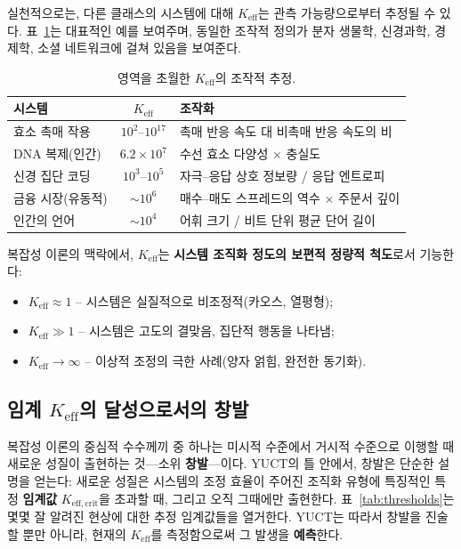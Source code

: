 \documentclass[11pt,a4paper]{article}
\theoremstyle{remark}
\newcommand{\Keff}{K_{\mathrm{eff}}}
\newcommand{\Keffcrit}{K_{\mathrm{eff},\text{crit}}}
\begin{document}
	실천적으로는, 다른 클래스의 시스템에 대해 \(\Keff\)는 관측 가능량으로부터 추정될 수 있다. 표~\ref{tab:keff_examples}는 대표적인 예를 보여주며, 동일한 조작적 정의가 분자 생물학, 신경과학, 경제학, 소셜 네트워크에 걸쳐 있음을 보여준다.
	
	\begin{table}[H]
		\centering
		\caption{영역을 초월한 \(\Keff\)의 조작적 추정.}
		\label{tab:keff_examples}
		\begin{tabular}{l c l}
			\toprule
			\textbf{시스템} & \(\Keff\) & \textbf{조작화} \\
			\midrule
			효소 촉매 작용 & \(10^2\)--\(10^{17}\) & 촉매 반응 속도 대 비촉매 반응 속도의 비 \\
			DNA 복제(인간) & \(6.2\times10^7\) & 수선 효소 다양성 \(\times\) 충실도 \\
			신경 집단 코딩 & \(10^3\)--\(10^5\) & 자극–응답 상호 정보량 / 응답 엔트로피 \\
			금융 시장(유동적) & \(\sim 10^6\) & 매수–매도 스프레드의 역수 \(\times\) 주문서 깊이 \\
			인간의 언어 & \(\sim 10^4\) & 어휘 크기 / 비트 단위 평균 단어 길이 \\
			\bottomrule
		\end{tabular}
	\end{table}
	
	복잡성 이론의 맥락에서, \(\Keff\)는 \textbf{시스템 조직화 정도의 보편적 정량적 척도}로서 기능한다:
	\begin{itemize}
		\item \(\Keff \approx 1\) – 시스템은 실질적으로 비조정적(카오스, 열평형);
		\item \(\Keff \gg 1\) – 시스템은 고도의 결맞음, 집단적 행동을 나타냄;
		\item \(\Keff \to \infty\) – 이상적 조정의 극한 사례(양자 얽힘, 완전한 동기화).
	\end{itemize}
	
	\subsection{임계 \(\Keff\)의 달성으로서의 창발}
	
	복잡성 이론의 중심적 수수께끼 중 하나는 미시적 수준에서 거시적 수준으로 이행할 때 새로운 성질이 출현하는 것—소위 \textbf{창발}—이다. YUCT의 틀 안에서, 창발은 단순한 설명을 얻는다: 새로운 성질은 시스템의 조정 효율이 주어진 조직화 유형에 특징적인 특정 \textbf{임계값} \(\Keffcrit\)을 초과할 때, 그리고 오직 그때에만 출현한다. 표~\ref{tab:thresholds}는 몇몇 잘 알려진 현상에 대한 추정 임계값들을 열거한다. YUCT는 따라서 창발을 진술할 뿐만 아니라, 현재의 \(\Keff\)를 측정함으로써 그 발생을 \textbf{예측}한다.
	
\end{document}

